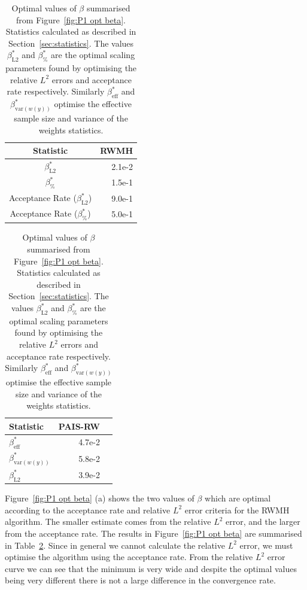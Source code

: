 \documentclass[final]{siamltex}
\begin{document}
\begin{table}[!htb]
    \begin{minipage}{.5\linewidth}
      \centering
        \begin{tabular}{|c|r|}
	\hline
	Statistic											& RWMH \\ \hline
	$\beta_{\text{L2}}^*$								& 2.1e-2 \\
	$\beta_{\%}^*$									& 1.5e-1 \\
	Acceptance Rate ($\beta_{\text{L2}}^*$)				& 9.0e-1 \\
	Acceptance Rate ($\beta_{\%}^*$)					& 5.0e-1 \\
	\hline
	\end{tabular}
    \end{minipage}%
    \begin{minipage}{.5\linewidth}
      \centering
        \begin{tabular}{|l|r|r|}
	\hline
	Statistic							& PAIS-RW \\ \hline
	$\beta_{\text{eff}}^*$				& 4.7e-2 \\
	$\beta_{\text{var}(w(y))}^*$		& 5.8e-2 \\
	$\beta_{\text{L2}}^*$				& 3.9e-2 \\
	\hline
	\end{tabular}
    \end{minipage}
	\vspace{1mm}
	\caption{Optimal values of $\beta$ summarised from Figure~\ref{fig:P1 opt beta}. Statistics calculated as described in Section~\ref{sec:statistics}. The values $\beta^*_{\text{L2}}$ and $\beta^*_{\%}$ are the optimal scaling parameters found by optimising the relative $L^2$ errors and acceptance rate respectively. Similarly $\beta_{\text{eff}}^*$ and $\beta_{\text{var}(w(y))}^*$ optimise the effective sample size and variance of the weights statistics.}
	\label{table:prob1 opt beta}
\end{table}

Figure~\ref{fig:P1 opt beta} (a) shows the two values of $\beta$ which are optimal according to the acceptance rate and relative $L^2$ error criteria for the RWMH algorithm. The smaller estimate comes from the relative $L^2$ error, and the larger from the acceptance rate. The results in Figure~\ref{fig:P1 opt beta} are summarised in Table~\ref{table:prob1 opt beta}. Since in general we cannot calculate the relative $L^2$ error, we must optimise the algorithm using the acceptance rate. From the relative $L^2$ error curve we can see that the minimum is very wide and despite the optimal values being very different there is not a large difference in the convergence rate.
\end{document}
